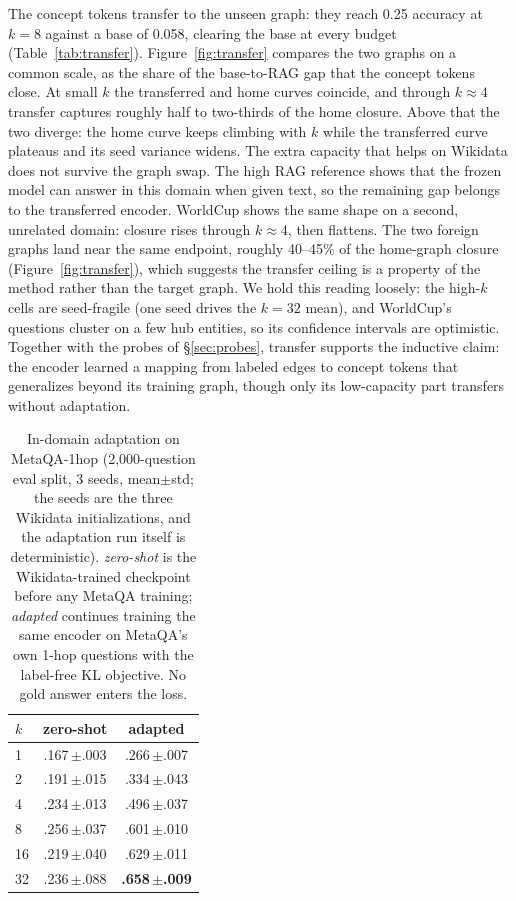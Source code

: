 \documentclass{article}
\begin{document}
The concept tokens transfer to the unseen graph: they reach 0.25 accuracy at $k{=}8$ against a
base of 0.058, clearing the base at every budget (Table~\ref{tab:transfer}). Figure~\ref{fig:transfer} compares the two graphs on a common
scale, as the share of the base-to-RAG gap that the concept tokens close. At small $k$ the
transferred and home curves coincide, and through $k{\approx}4$ transfer captures roughly half
to two-thirds of the home closure. Above that the two diverge: the home curve keeps climbing
with $k$ while the transferred curve plateaus and its seed variance widens. The extra capacity
that helps on Wikidata does not survive the graph swap. The high RAG reference shows that the
frozen model can answer in this domain when given text, so the remaining gap belongs to the
transferred encoder. WorldCup shows the same shape on a second, unrelated domain: closure rises
through $k{\approx}4$, then flattens. The two foreign graphs land near the same endpoint,
roughly 40--45\% of the home-graph closure (Figure~\ref{fig:transfer}), which suggests the
transfer ceiling is a property of the method rather than the target graph. We hold this reading
loosely: the high-$k$ cells are seed-fragile (one seed drives the $k{=}32$ mean), and WorldCup's
questions cluster on a few hub entities, so its confidence intervals are optimistic. Together
with the probes of \S\ref{sec:probes}, transfer supports the inductive claim: the encoder
learned a mapping from labeled edges to concept tokens that generalizes beyond its training
graph, though only its low-capacity part transfers without adaptation.

\begin{table}[t]
  \caption{In-domain adaptation on MetaQA-1hop (2{,}000-question eval split, 3 seeds,
  mean$\pm$std; the seeds are the three Wikidata initializations, and the adaptation run itself
  is deterministic). \emph{zero-shot} is the Wikidata-trained checkpoint before any MetaQA
  training; \emph{adapted} continues training the same encoder on MetaQA's own 1-hop questions
  with the label-free KL objective. No gold answer enters the loss.}
  \label{tab:adaptation}
  \centering
  \small
  \begin{tabular}{lcc}
    \toprule
    $k$ & zero-shot & adapted\\
    \midrule
    1  & .167\,$\pm$.003 & .266\,$\pm$.007\\
    2  & .191\,$\pm$.015 & .334\,$\pm$.043\\
    4  & .234\,$\pm$.013 & .496\,$\pm$.037\\
    8  & .256\,$\pm$.037 & .601\,$\pm$.010\\
    16 & .219\,$\pm$.040 & .629\,$\pm$.011\\
    32 & .236\,$\pm$.088 & \textbf{.658\,$\pm$.009}\\
    \bottomrule
  \end{tabular}
\end{table}
\end{document}
